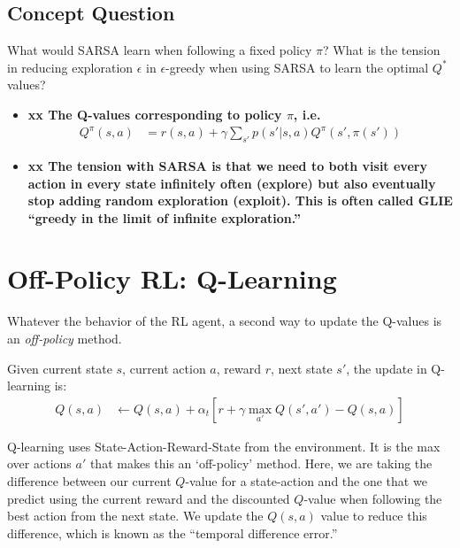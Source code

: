 \documentclass[12pt]{article}
\begin{document}
      \subsection{Concept Question}

      What would SARSA learn when following a fixed policy $\pi$? What
      is the tension in reducing exploration $\epsilon$ in
      $\epsilon$-greedy when using SARSA to learn the optimal $Q^*$ values?
      \begin{itemize}
      \item  {\bf xx The Q-values corresponding to policy $\pi$, i.e.
          \begin{align}
           Q^\pi(s,a)&=r(s,a)+\gamma\sum_{s'}p(s'|s,a)Q^\pi(s',\pi(s'))
        \end{align}
      }
      \item {\bf xx The tension with SARSA  is that we need to both visit every
          action in every state infinitely often (explore) but also
          eventually stop adding random exploration (exploit). This is
        often called GLIE ``greedy in the limit of infinite exploration.''}
      \end{itemize}
      

\section{Off-Policy RL: Q-Learning}

Whatever the behavior of the RL agent, a second way to update the
Q-values is an \emph{off-policy} method. 


Given current state $s$, current action $a$, reward $r$, next state
$s'$, the update in Q-learning is:
%
%
\begin{align}
  Q(s,a) & \leftarrow  Q(s,a)+\alpha_t[r +\gamma
           \max_{a'}Q(s',a')-Q(s,a)]
           \end{align}

           Q-learning uses State-Action-Reward-State from the
           environment.  It is the max over actions $a'$ that makes
          this an `off-policy' method.
          Here, we are taking the difference between our current $Q$-value
          for a state-action and the one that we predict using the
          current reward and the discounted $Q$-value when following
          the best action from the next state. 
          We update the $Q(s,a)$ value to reduce this difference,
          which is known as the ``temporal difference error.''
\end{document}

